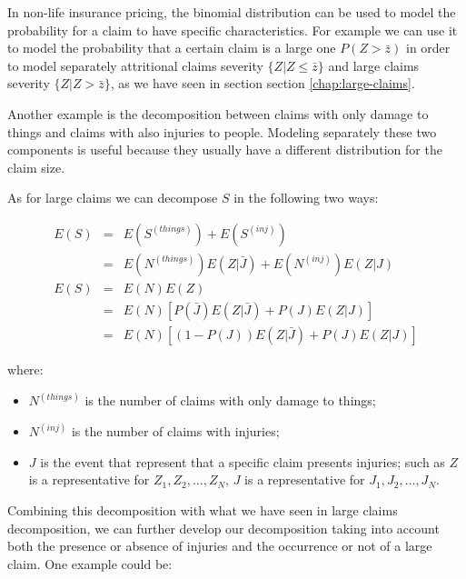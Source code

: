 \documentclass[a4paper, nobind]{templates/ociamthesis}
\providecommand{\tightlist}{%
  \setlength{\itemsep}{0pt}\setlength{\parskip}{0pt}}
\theoremstyle{definition}
\theoremstyle{definition}
\theoremstyle{definition}
\theoremstyle{remark}
\begin{document}
In non-life insurance pricing, the binomial distribution can be used to model the probability for a claim to have specific characteristics. For example we can use it to model the probability that a certain claim is a large one \(P(Z>\bar{z})\) in order to model separately attritional claims severity \(\{Z|Z\le\bar{z}\}\) and large claims severity \(\{Z|Z>\bar{z}\}\), as we have seen in section section \ref{chap:large-claims}.

Another example is the decomposition between claims with only damage to things and claims with also injuries to people. Modeling separately these two components is useful because they usually have a different distribution for the claim size.

As for large claims we can decompose \(S\) in the following two ways:

\begin{eqnarray}
  \nonumber
  E(S) & = & E(S^{(things)}) + E(S^{(inj)}) \\
    \label{inj-claim-decomposition-expected-1}
    & = & E(N^{(things)}) E(Z|\bar{J}) + E(N^{(inj)}) E(Z|J) \\[12pt]
  \nonumber
  E(S) & = & E(N) E(Z) \\
    \nonumber
    & = & E(N) \left[P(\bar{J}) E(Z|\bar{J}) + P(J) E(Z|J) \right] \\
    \label{inj-claim-decomposition-expected-2}
    & = & E(N) \left[\left( 1 - P(J) \right) E(Z|\bar{J}) + P(J) E(Z|J)\right]
\end{eqnarray}

where:

\begin{itemize}
\tightlist
\item
  \(N^{(things)}\) is the number of claims with only damage to things;
\item
  \(N^{(inj)}\) is the number of claims with injuries;
\item
  \(J\) is the event that represent that a specific claim presents injuries; such as \(Z\) is a representative for \(Z_1, Z_2, \dots, Z_N\), \(J\) is a representative for \(J_1, J_2, \dots, J_N\).
\end{itemize}

Combining this decomposition with what we have seen in large claims decomposition, we can further develop our decomposition taking into account both the presence or absence of injuries and the occurrence or not of a large claim. One example could be:
\end{document}
